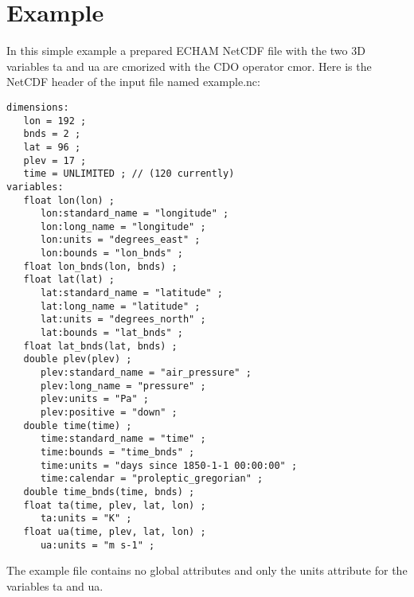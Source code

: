 \appendix

\chapter{Example}

In this simple example a prepared ECHAM NetCDF file with the two 3D
variables ta and ua are cmorized with the CDO operator cmor. 
Here is the NetCDF header of the input file named example.nc:
\begin{lstlisting}[frame=single, backgroundcolor=\color{pcolor1}, basicstyle=\footnotesize]
dimensions:
   lon = 192 ;
   bnds = 2 ;
   lat = 96 ;
   plev = 17 ;
   time = UNLIMITED ; // (120 currently)
variables:
   float lon(lon) ;
      lon:standard_name = "longitude" ;
      lon:long_name = "longitude" ;
      lon:units = "degrees_east" ;
      lon:bounds = "lon_bnds" ;
   float lon_bnds(lon, bnds) ;
   float lat(lat) ;
      lat:standard_name = "latitude" ;
      lat:long_name = "latitude" ;
      lat:units = "degrees_north" ;
      lat:bounds = "lat_bnds" ;
   float lat_bnds(lat, bnds) ;
   double plev(plev) ;
      plev:standard_name = "air_pressure" ;
      plev:long_name = "pressure" ;
      plev:units = "Pa" ;
      plev:positive = "down" ;
   double time(time) ;
      time:standard_name = "time" ;
      time:bounds = "time_bnds" ;
      time:units = "days since 1850-1-1 00:00:00" ;
      time:calendar = "proleptic_gregorian" ;
   double time_bnds(time, bnds) ;
   float ta(time, plev, lat, lon) ;
      ta:units = "K" ;
   float ua(time, plev, lat, lon) ;
      ua:units = "m s-1" ;
\end{lstlisting}
The example file contains no global attributes and only the units
attribute for the variables ta and ua.

